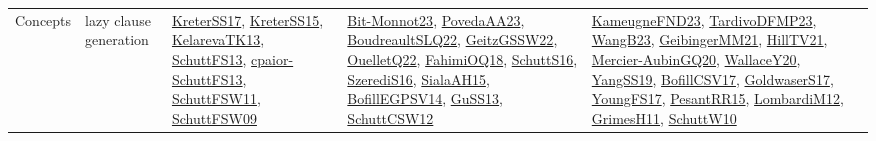 {\begin{longtable}{llp{6cm}p{6cm}p{6cm}}
Concepts & lazy clause generation & \href{articles/KreterSS17.pdf}{KreterSS17}\cite{KreterSS17}, \href{papers/KreterSS15.pdf}{KreterSS15}\cite{KreterSS15}, \href{papers/KelarevaTK13.pdf}{KelarevaTK13}\cite{KelarevaTK13}, \href{papers/SchuttFS13.pdf}{SchuttFS13}\cite{SchuttFS13}, \href{papers/cpaior-SchuttFS13.pdf}{cpaior-SchuttFS13}\cite{cpaior-SchuttFS13}, \href{articles/SchuttFSW11.pdf}{SchuttFSW11}\cite{SchuttFSW11}, \href{papers/SchuttFSW09.pdf}{SchuttFSW09}\cite{SchuttFSW09} & \href{papers/Bit-Monnot23.pdf}{Bit-Monnot23}\cite{Bit-Monnot23}, \href{papers/PovedaAA23.pdf}{PovedaAA23}\cite{PovedaAA23}, \href{papers/BoudreaultSLQ22.pdf}{BoudreaultSLQ22}\cite{BoudreaultSLQ22}, \href{papers/GeitzGSSW22.pdf}{GeitzGSSW22}\cite{GeitzGSSW22}, \href{papers/OuelletQ22.pdf}{OuelletQ22}\cite{OuelletQ22}, \href{articles/FahimiOQ18.pdf}{FahimiOQ18}\cite{FahimiOQ18}, \href{papers/SchuttS16.pdf}{SchuttS16}\cite{SchuttS16}, \href{papers/SzerediS16.pdf}{SzerediS16}\cite{SzerediS16}, \href{papers/SialaAH15.pdf}{SialaAH15}\cite{SialaAH15}, \href{papers/BofillEGPSV14.pdf}{BofillEGPSV14}\cite{BofillEGPSV14}, \href{papers/GuSS13.pdf}{GuSS13}\cite{GuSS13}, \href{papers/SchuttCSW12.pdf}{SchuttCSW12}\cite{SchuttCSW12} & \href{papers/KameugneFND23.pdf}{KameugneFND23}\cite{KameugneFND23}, \href{papers/TardivoDFMP23.pdf}{TardivoDFMP23}\cite{TardivoDFMP23}, \href{papers/WangB23.pdf}{WangB23}\cite{WangB23}, \href{papers/GeibingerMM21.pdf}{GeibingerMM21}\cite{GeibingerMM21}, \href{papers/HillTV21.pdf}{HillTV21}\cite{HillTV21}, \href{papers/Mercier-AubinGQ20.pdf}{Mercier-AubinGQ20}\cite{Mercier-AubinGQ20}, \href{articles/WallaceY20.pdf}{WallaceY20}\cite{WallaceY20}, \href{papers/YangSS19.pdf}{YangSS19}\cite{YangSS19}, \href{papers/BofillCSV17.pdf}{BofillCSV17}\cite{BofillCSV17}, \href{papers/GoldwaserS17.pdf}{GoldwaserS17}\cite{GoldwaserS17}, \href{papers/YoungFS17.pdf}{YoungFS17}\cite{YoungFS17}, \href{papers/PesantRR15.pdf}{PesantRR15}\cite{PesantRR15}, \href{articles/LombardiM12.pdf}{LombardiM12}\cite{LombardiM12}, \href{papers/GrimesH11.pdf}{GrimesH11}\cite{GrimesH11}, \href{papers/SchuttW10.pdf}{SchuttW10}\cite{SchuttW10}\\

\end{longtable}}
